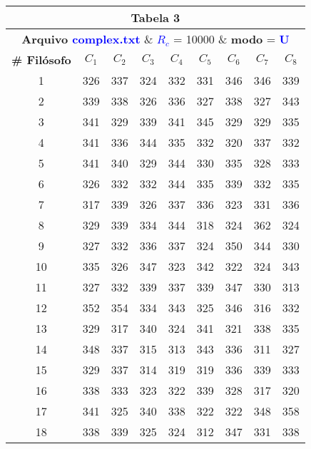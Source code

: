 \documentclass[11pt]{article}
\begin{document}
\begin{table}[!h]
	\begin{center}
		\begin{tabular}{| c | c | c | c | c | c | c | c | c |}
		\hline
		\multicolumn{9}{|c|}{\textbf{Tabela 3}} \\ \hline
		\multicolumn{9}{|c|}{\textbf{Arquivo \textcolor{blue}{complex.txt}} \& \textbf{\textcolor{blue}{$R_c$}} = 10000 \& \textbf{modo} = \textbf{\textcolor{blue}{U}}} \\
		\hline
			\textbf{\# Filósofo} & \textbf{$C_1$} & \textbf{$C_2$} & \textbf{$C_3$} & \textbf{$C_4$} & \textbf{$C_5$} & \textbf{$C_6$} & \textbf{$C_7$} & \textbf{$C_8$} \\ \hline
			1  & 326 & 337 & 324 & 332 & 331 & 346 & 346 & 339 \\ \hline
			2  & 339 & 338 & 326 & 336 & 327 & 338 & 327 & 343 \\ \hline
			3  & 341 & 329 & 339 & 341 & 345 & 329 & 329 & 335 \\ \hline
			4  & 341 & 336 & 344 & 335 & 332 & 320 & 337 & 332 \\ \hline
			5  & 341 & 340 & 329 & 344 & 330 & 335 & 328 & 333 \\ \hline
			6  & 326 & 332 & 332 & 344 & 335 & 339 & 332 & 335 \\ \hline
			7  & 317 & 339 & 326 & 337 & 336 & 323 & 331 & 336 \\ \hline
			8  & 329 & 339 & 334 & 344 & 318 & 324 & 362 & 324 \\ \hline
			9  & 327 & 332 & 336 & 337 & 324 & 350 & 344 & 330 \\ \hline
			10 & 335 & 326 & 347 & 323 & 342 & 322 & 324 & 343 \\ \hline
			11 & 327 & 332 & 339 & 337 & 339 & 347 & 330 & 313 \\ \hline
			12 & 352 & 354 & 334 & 343 & 325 & 346 & 316 & 332 \\ \hline
			13 & 329 & 317 & 340 & 324 & 341 & 321 & 338 & 335 \\ \hline
			14 & 348 & 337 & 315 & 313 & 343 & 336 & 311 & 327 \\ \hline
			15 & 329 & 337 & 314 & 319 & 319 & 336 & 339 & 333 \\ \hline
			16 & 338 & 333 & 323 & 322 & 339 & 328 & 317 & 320 \\ \hline
			17 & 341 & 325 & 340 & 338 & 322 & 322 & 348 & 358 \\ \hline
			18 & 338 & 339 & 325 & 324 & 312 & 347 & 331 & 338 \\ \hline

\end{tabular}
\end{center}
\end{table}
\end{document}
